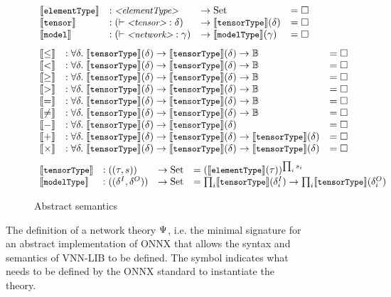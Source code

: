 \begin{figure}
	\begin{subfigure}{\textwidth}
	\begin{minipage}[t]{0.5\textwidth}
	\setlength{\arraycolsep}{2pt}
	\begin{equation*}
	\begin{array}{llll}
	\semElementType 
	&: \mgrammar{<elementType>}
	&\rightarrow \set
	&= \missing 
	\\
	\semTensor
	&: (\vdash \mgrammar{<tensor>} : \tensorTypeVar )
	& \rightarrow \semTensorType(\tensorTypeVar)
	&= \missing 
	\\
	\semModel
	&: (\vdash \mgrammar{<network>} : \modelTypeVar) 
	& \rightarrow \semModelType(\modelTypeVar) 
	&= \missing
	\end{array}
	\end{equation*}
	\begin{equation*}
	\begin{array}{llll}
	\compSem{\leq}
	\\
	\compSem{<}
	\\
	\compSem{\geq}
	\\
	\compSem{>}
	\\
	\compSem{=}
	\\
	\compSem{\neq}
	\\
	\opOneSem{-}
	\\
	\opTwoSem{+}
	\\
	\opTwoSem{\times}
	\end{array}
	\end{equation*}
	\begin{equation*}
	\begin{array}{llll}
	\semTensorType 
	&: ((\elementTypeVar, s))
	& \rightarrow \set
	&= (\semElementType(\elementTypeVar))^{\prod_i s_i}
	\\
	\semModelType 
	&: ((\tensorTypeVar^I, \tensorTypeVar^O))
	& \rightarrow \set 
	&= \prod_{i} \semTensorType(\tensorTypeVar^I_i)  \rightarrow
	\prod_{i} \semTensorType(\tensorTypeVar^O_i)
	\end{array}
	\end{equation*}
	\end{minipage}
	\caption{Abstract semantics}
	\label{fig:onnx-semantics}
	\end{subfigure}
	\caption{The definition of a network theory $\networkTheoryVar$, i.e. the minimal signature for an abstract implementation of ONNX that allows the syntax and semantics of VNN-LIB to be defined. The \missing{} symbol indicates what needs to be defined by the ONNX standard to instantiate the theory.}
	\label{fig:onnx-signature}
\end{figure}


